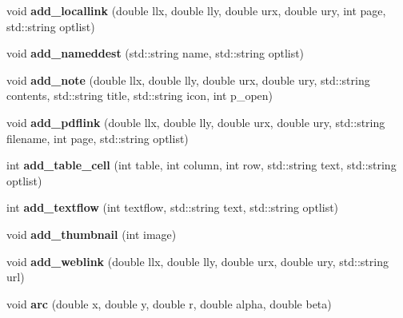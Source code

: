 \begin{DoxyCompactItemize}
\item 
\hypertarget{classPDFlib_a2d47dcbd27a69e9c1c02ca608f927ab7}{void {\bfseries add\-\_\-locallink} (double llx, double lly, double urx, double ury, int page, std\-::string optlist)}\label{classPDFlib_a2d47dcbd27a69e9c1c02ca608f927ab7}

\item 
\hypertarget{classPDFlib_a16845662dabe0494d69b016846f2adcc}{void {\bfseries add\-\_\-nameddest} (std\-::string name, std\-::string optlist)}\label{classPDFlib_a16845662dabe0494d69b016846f2adcc}

\item 
\hypertarget{classPDFlib_ab054c136755f297058ac9812adefafec}{void {\bfseries add\-\_\-note} (double llx, double lly, double urx, double ury, std\-::string contents, std\-::string title, std\-::string icon, int p\-\_\-open)}\label{classPDFlib_ab054c136755f297058ac9812adefafec}

\item 
\hypertarget{classPDFlib_acc2002bc0e060620bfe97eae7dcc9371}{void {\bfseries add\-\_\-pdflink} (double llx, double lly, double urx, double ury, std\-::string filename, int page, std\-::string optlist)}\label{classPDFlib_acc2002bc0e060620bfe97eae7dcc9371}

\item 
\hypertarget{classPDFlib_a153ce04a9c160a24d13763f8ba6578fa}{int {\bfseries add\-\_\-table\-\_\-cell} (int table, int column, int row, std\-::string text, std\-::string optlist)}\label{classPDFlib_a153ce04a9c160a24d13763f8ba6578fa}

\item 
\hypertarget{classPDFlib_a44f52fd96b6152a2b4ae4f71cebcf36b}{int {\bfseries add\-\_\-textflow} (int textflow, std\-::string text, std\-::string optlist)}\label{classPDFlib_a44f52fd96b6152a2b4ae4f71cebcf36b}

\item 
\hypertarget{classPDFlib_a7561fadef64e392f98d047d5b6e79946}{void {\bfseries add\-\_\-thumbnail} (int image)}\label{classPDFlib_a7561fadef64e392f98d047d5b6e79946}

\item 
\hypertarget{classPDFlib_afdba46325698218399dda4b415204edd}{void {\bfseries add\-\_\-weblink} (double llx, double lly, double urx, double ury, std\-::string url)}\label{classPDFlib_afdba46325698218399dda4b415204edd}

\item 
\hypertarget{classPDFlib_aee884c54b243c01230926f493f06eaf9}{void {\bfseries arc} (double x, double y, double r, double alpha, double beta)}\label{classPDFlib_aee884c54b243c01230926f493f06eaf9}


\end{DoxyCompactItemize}
